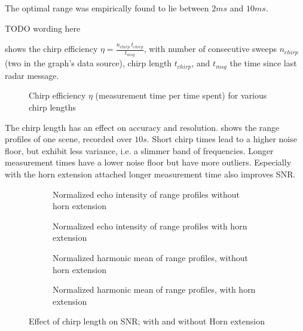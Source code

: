 The optimal range was empirically found to lie between \(2ms\) and
\(10ms\).

TODO wording here

 shows the chirp efficiency
\(\eta = \frac{n_{chirp}~t_{chirp}}{t_{msg}}\), with number of
consecutive sweeps \(n_{chirp}\) (two in the graph's data source), chirp
length \(t_{chirp}\), and \(t_{msg}\) the time since last radar message.

\begin{figure}[htbp]
    \centering
    \def\svgwidth{10cm}
    
    \caption{Chirp efficiency \(\eta\) (measurement time per time spent) for various chirp lengths}
    \label{fig:fig_chirp_eff}
\end{figure}

The chirp length has an effect on accuracy and resolution.  shows the range profiles of one scene, recorded over $10s$. Short chirp times lead to a higher noise floor, but exhibit less variance, i.e. a slimmer band of frequencies. Longer measurement times have a lower noise floor but have more outliers. Especially with the horn extension attached longer measurement time also improves SNR.

\begin{figure}[htbp]
    \centering
    \begin{subfigure}{0.475 \textwidth}
        \centering
        \def\svgwidth{\linewidth} \small
        
        \caption{Normalized echo intensity of range profiles without horn extension}
        \bigskip
    \end{subfigure}
    \hfill
    \begin{subfigure}{0.475 \textwidth}
        \centering
        \def\svgwidth{\linewidth} \small
        
        \caption{Normalized echo intensity of range profiles with horn extension}
        \bigskip
    \end{subfigure}
    \begin{subfigure}{0.475 \textwidth}
        \centering
        \def\svgwidth{\linewidth} \small
        
        \caption{Normalized harmonic mean of range profiles, without horn extension}
    \end{subfigure}
    \hfill
    \begin{subfigure}{0.475 \textwidth}
        \centering
        \def\svgwidth{\linewidth} \small
        
        \caption{Normalized harmonic mean of range profiles, with horn extension}
    \end{subfigure}
    \caption{Effect of chirp length on SNR; with and without Horn extension}
    \label{fig:fig_compare_chirp_times}
\end{figure}



